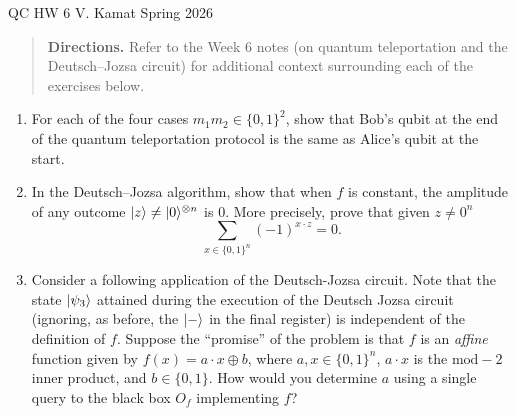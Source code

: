 \documentclass[12pt]{article}
\begin{document}
	
\centerline{QC HW 6
	\hspace{0.4 in}V. Kamat
	\hspace{0.4 in}Spring 2026}
	\begin{quote}
		{\sf
		{\bf Directions.} Refer to the Week 6 notes (on quantum teleportation and the Deutsch--Jozsa circuit) for additional context surrounding each of the exercises below.  
		}
	\end{quote}
\begin{enumerate}
\item For each of the four cases $m_1m_2\in \{0,1\}^2$, show that Bob's qubit at the end of the quantum teleportation protocol is the same as Alice's qubit at the start. 
\item In the Deutsch--Jozsa algorithm, show that when $f$ is constant, the amplitude of any outcome $\ket{z} \neq |0\rangle^{\otimes n}$ is $0$. More precisely, prove that given $z\neq 0^n$
\[
\sum_{x\in\{0,1\}^n} (-1)^{x\cdot z} = 0.
\]
\item Consider a following application of the Deutsch-Jozsa circuit. Note that the state $\ket{\psi_3}$ attained during the execution of the Deutsch Jozsa circuit (ignoring, as before, the $\ket{-}$ in the final register) is independent of the definition of $f$. Suppose the ``promise'' of the problem is that $f$ is an \emph{affine} function given by $f(x)=a\cdot x\oplus b$, where $a,x\in \{0,1\}^n$, $a\cdot x$ is the $\text{mod}-2$ inner product, and $b\in \{0,1\}$. How would you determine $a$ using a single query to the black box $O_f$ implementing $f$? 
\end{enumerate}
\end{document}
